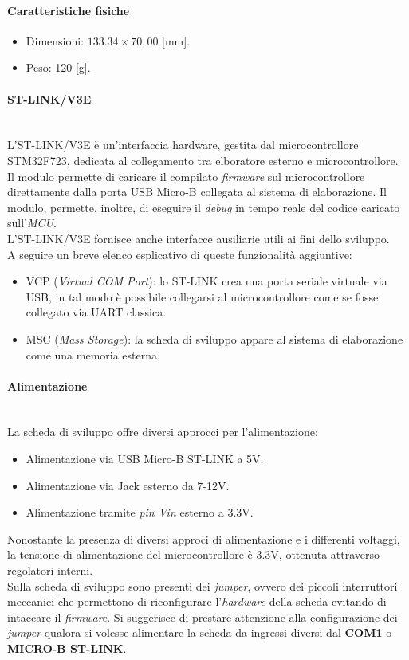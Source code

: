 \paragraph{Caratteristiche fisiche}
\begin{itemize}
    \item Dimensioni: $133.34\times 70,00$ [mm].
    \item Peso: 120 [g].
\end{itemize}

\paragraph{ST-LINK/V3E}\mbox{}\\
L'ST-LINK/V3E è un'interfaccia hardware, gestita dal microcontrollore STM32F723, dedicata al collegamento tra elboratore esterno e microcontrollore. Il modulo permette di caricare il compilato \textit{firmware} sul microcontrollore direttamente dalla porta USB Micro-B collegata al sistema di elaborazione.
Il modulo, permette, inoltre, di eseguire il \textit{debug} in tempo reale del codice caricato sull'\textit{MCU}.\\
L'ST-LINK/V3E fornisce anche interfacce ausiliarie utili ai fini dello sviluppo.\\
A seguire un breve elenco esplicativo di queste funzionalità aggiuntive:
\begin{itemize}
    \item VCP (\textit{Virtual COM Port}): lo ST-LINK crea una porta seriale virtuale via USB, in tal modo è possibile collegarsi al microcontrollore come se fosse collegato via UART classica.
    \item MSC (\textit{Mass Storage}): la scheda di sviluppo appare al sistema di elaborazione come una memoria esterna.
\end{itemize}

\paragraph{Alimentazione}\mbox{}\\
La scheda di sviluppo offre diversi approcci per l'alimentazione: 
\begin{itemize}
    \item Alimentazione via USB Micro-B ST-LINK a 5V.
    \item Alimentazione via Jack esterno da 7-12V.
    \item Alimentazione tramite \textit{pin Vin} esterno a 3.3V.
\end{itemize}
Nonostante la presenza di diversi approci di alimentazione e i differenti voltaggi, la tensione di alimentazione del microcontrollore è 3.3V, ottenuta attraverso regolatori interni.\\
Sulla scheda di sviluppo sono presenti dei \textit{jumper}, ovvero dei piccoli interruttori meccanici che permettono di riconfigurare l'\textit{hardware} della scheda evitando di intaccare il \textit{firmware}. Si suggerisce di prestare attenzione alla configurazione 
dei \textit{jumper} qualora si volesse alimentare la scheda da ingressi diversi dal \textbf{COM1} o \textbf{MICRO-B ST-LINK}.\\

